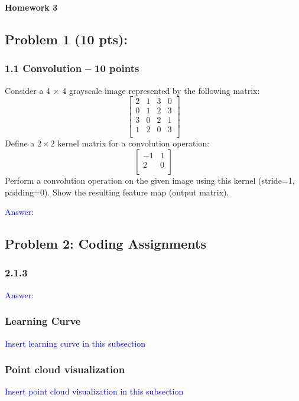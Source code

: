 \documentclass[12pt,letterpaper]{article}
\begin{document}
  \thispagestyle{firstpagestyle}
  \begin{center}
    {\huge \textbf{Homework 3}}
  \end{center}


 
\subsection*{Problem 1 (10 pts): }

\subsubsection*{1.1 Convolution -- 10 points}


Consider a 4 $\times$ 4 grayscale image represented by the following matrix:
\[ \begin{bmatrix}
2 & 1 & 3 & 0 \\
0 & 1 & 2 & 3 \\
3 & 0 & 2 & 1 \\
1 & 2 & 0 & 3 \\
\end{bmatrix} \]
Define a \(2 \times 2\) kernel matrix for a convolution operation:
\[ \begin{bmatrix}
-1 & 1 \\
2 & 0 \\
\end{bmatrix} \]
Perform a convolution operation on the given image using this kernel (stride=1, padding=0). Show the resulting feature map (output matrix). 

\textcolor{blue}{Answer:}

\subsection*{Problem 2: Coding Assignments}
\subsubsection*{2.1.3}
\textcolor{blue}{Answer:}

\subsubsection*{Learning Curve}
\textcolor{blue}{Insert learning curve in this subsection}
\subsubsection*{Point cloud visualization}
\textcolor{blue}{Insert point cloud visualization in this subsection}
\end{document}
